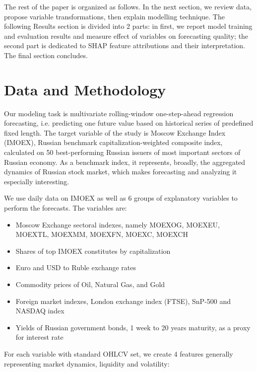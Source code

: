 \documentclass[review, authoryear]{elsarticle}
\begin{document}
The rest of the paper is organized as follows. In the next section, we review data, propose variable transformations, then explain modelling technique. The following Results section is divided into 2 parts: in first, we report model training and evaluation results and measure effect of variables on forecasting quality; the second part is dedicated to SHAP feature attributions and their interpretation. 
The final section concludes.

\section{Data and Methodology}

\noindent Our modeling task is multivariate rolling-window one-step-ahead regression forecasting, i.e. predicting one future value based on historical series of predefined fixed length. The target variable of the study is Moscow Exchange Index (IMOEX), Russian benchmark capitalization-weighted composite index, calculated on 50 best-performing Russian issuers of most important sectors of Russian economy. As a benchmark index, it represents, broadly, the aggregated dynamics of Russian stock market, which makes forecasting and analyzing it especially interesting.

We use daily data on IMOEX as well as 6 groups of explanatory variables to perform the forecasts. The variables are:

\sloppy
\begin{itemize}
\item Moscow Exchange sectoral indexes, namely 
MOEXOG, MOEXEU, MOEXTL, MOEXMM, MOEXFN, MOEXC, MOEXCH
\item Shares of top IMOEX constitutes by capitalization
\item Euro and USD to Ruble exchange rates
\item Commodity prices of Oil, Natural Gas, and Gold
\item Foreign market indexes, London exchange index (FTSE), SnP-500 and NASDAQ index
\item Yields of Russian government bonds, 1 week to 20 years maturity, as a proxy for interest rate
\end{itemize}

For each variable with standard OHLCV set, we create 4 features generally representing market dynamics, liquidity and volatility:
\end{document}
